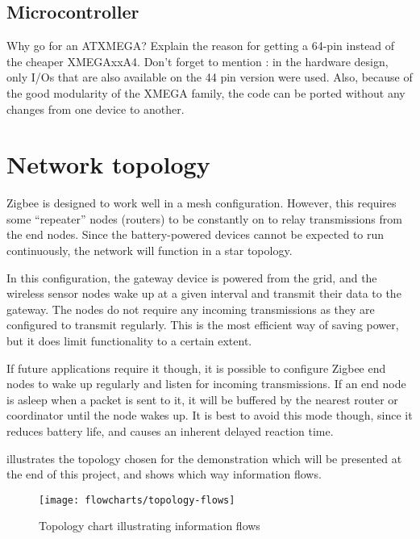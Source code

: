 \subsection{Microcontroller}
\label{sub:microcontroller}
Why go for an ATXMEGA?
Explain the reason for getting a 64-pin instead of the cheaper XMEGAxxA4.
Don't forget to mention : in the hardware design, only I/Os that are also
available on the 44 pin version were used. Also, because of the good modularity
of the XMEGA family, the code can be ported without any changes from one device
to another.


\section{Network topology}
\label{sec:network-topology}

Zigbee is designed to work well in a mesh configuration. However, this requires
some ``repeater'' nodes (routers) to be constantly on to relay transmissions
from the end nodes. Since the battery-powered devices cannot be expected to run
continuously, the network will function in a star topology.

In this configuration, the gateway device is powered from the grid, and the
wireless sensor nodes wake up at a given interval and transmit their data to the
gateway. The nodes do not require any incoming transmissions as they are
configured to transmit regularly. This is the most efficient way of saving
power, but it does limit functionality to a certain extent.

If future applications require it though, it is possible to configure Zigbee end
nodes to wake up regularly and listen for incoming transmissions. If an end node
is asleep when a packet is sent to it, it will be buffered by the nearest router
or coordinator until the node wakes up. It is best to avoid this mode though,
since it reduces battery life, and causes an inherent delayed reaction time.

 illustrates the topology chosen for the demonstration
which will be presented at the end of this project, and shows which way
information flows. 

\begin{figure}[h]
  \begin{center}
    \texttt{[image: flowcharts/topology-flows]}
  \end{center}
  \caption{Topology chart illustrating information flows}
  \label{fig:topology-flows}
\end{figure}

